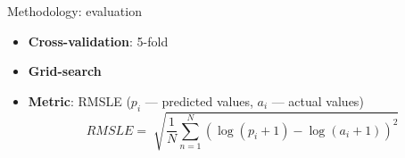\begin{frame}{Methodology: evaluation}
	\begin{itemize}
		\item \textbf{Cross-validation}: 5-fold
		\item \textbf{Grid-search}
		\item \textbf{Metric}: RMSLE ($p_i$ --- predicted values, $a_i$ --- actual values)
		$$ RMSLE = \sqrt[]{\frac{1}{N}\sum_{n = 1}^N (\log(p_i + 1) - \log(a_i + 1))^2} $$
	\end{itemize}
\end{frame}
